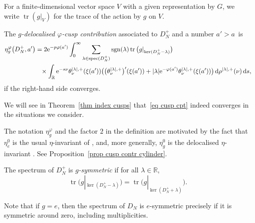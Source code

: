 \documentclass[pdftex]{sigma}%
\numberwithin{equation}{section}
\DeclareMathOperator{\tr}{tr}
\DeclareMathOperator{\spec}{spec}
\DeclareMathOperator{\sgn}{sgn}
\newcommand{\R}{\mathbb{R}}
\begin{document}
For a finite-dimensional vector space $V$ with a given representation by $G$, we write $\tr(g|_V)$ for the trace of the action by $g$ on $V$.
\begin{Definition}\label{def cusp cpt}
The \emph{$g$-delocalised $\varphi$-cusp contribution} associated to $D_N^+$ and a number ${a'>a}$~is
\begin{align}
\eta^{\varphi}_g\big(D_N^+, a'\big)&=2 {\rm e}^{-p\varphi(a')} \int_{0}^{\infty}
\sum_{\lambda \in \spec(D_N^+)}\sgn(\lambda) \tr\big(g|_{\ker(D_N^+ - \lambda)}\big)
\label{eq cusp cpt}
\\
&\phantom{=} \times
\int_{\R} {\rm e}^{-s\nu}
\theta^{|\lambda|, +}_{\nu} (\xi(a'))
 \big(\big(\theta^{|\lambda|, +}_{\nu} \big)'(\xi(a')) +|\lambda| {\rm e}^{-\varphi(a')} \theta^{|\lambda|, +}_{\nu} (\xi(a'))
 \big)\,{\rm d}\rho^{|\lambda|, +}(\nu)\nonumber
 \, {\rm d}s,
\end{align}
if the right-hand side converges.
\end{Definition}
We will see in Theorem~\ref{thm index cusps} that~\eqref{eq cusp cpt} indeed converges in the situations we consider.

The notation $\eta^{\varphi}_g$ and the factor $2$ in the definition are motivated by the fact that $\eta^0_e$ is the usual $\eta$-invariant of \cite{APS1}, and, more generally, $\eta^0_g$ is the delocalised $\eta$-invariant \cite{Donnelly}. See Proposition~\ref{prop cusp contr cylinder}.

\begin{Definition}%
The spectrum of $D_N^+$ is \emph{$g$-symmetric} if for all $\lambda \in \R$,
\[
\tr\big(g|_{\ker(D_N^+ - \lambda)}\big) = \tr\big(g|_{\ker(D_N^+ + \lambda)}\big).
\]
\end{Definition}
Note that if $g=e$, then the spectrum of $D_N$ is {$e$-symmetric} precisely if it is symmetric around zero, including multiplicities.
\end{document}
